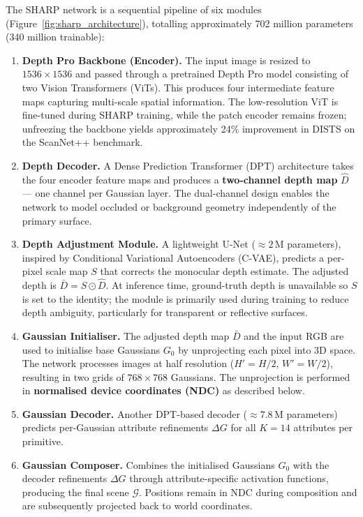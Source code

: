 The SHARP network is a sequential pipeline of six modules (Figure~\ref{fig:sharp_architecture}), totalling approximately 702 million parameters (340 million trainable):

\begin{enumerate}
    \item \textbf{Depth Pro Backbone (Encoder).} The input image is resized to $1536 \times 1536$ and passed through a pretrained Depth Pro model consisting of two Vision Transformers (ViTs). This produces four intermediate feature maps capturing multi-scale spatial information. The low-resolution ViT is fine-tuned during SHARP training, while the patch encoder remains frozen; unfreezing the backbone yields approximately 24\% improvement in DISTS on the ScanNet++ benchmark.

    \item \textbf{Depth Decoder.} A Dense Prediction Transformer (DPT) architecture takes the four encoder feature maps and produces a \textbf{two-channel depth map} $\hat{D}$ — one channel per Gaussian layer. The dual-channel design enables the network to model occluded or background geometry independently of the primary surface.

    \item \textbf{Depth Adjustment Module.} A lightweight U-Net (${\approx}2$\,M parameters), inspired by Conditional Variational Autoencoders (C-VAE), predicts a per-pixel scale map $S$ that corrects the monocular depth estimate. The adjusted depth is $\bar{D} = S \odot \hat{D}$. At inference time, ground-truth depth is unavailable so $S$ is set to the identity; the module is primarily used during training to reduce depth ambiguity, particularly for transparent or reflective surfaces.

    \item \textbf{Gaussian Initialiser.} The adjusted depth map $\bar{D}$ and the input RGB are used to initialise base Gaussians $G_0$ by unprojecting each pixel into 3D space. The network processes images at half resolution ($H' = H/2$, $W' = W/2$), resulting in two grids of $768 \times 768$ Gaussians. The unprojection is performed in \textbf{normalised device coordinates (NDC)} as described below.

    \item \textbf{Gaussian Decoder.} Another DPT-based decoder (${\approx}7.8$\,M parameters) predicts per-Gaussian attribute refinements $\Delta G$ for all $K{=}14$ attributes per primitive.

    \item \textbf{Gaussian Composer.} Combines the initialised Gaussians $G_0$ with the decoder refinements $\Delta G$ through attribute-specific activation functions, producing the final scene $\mathcal{G}$. Positions remain in NDC during composition and are subsequently projected back to world coordinates.
\end{enumerate}

